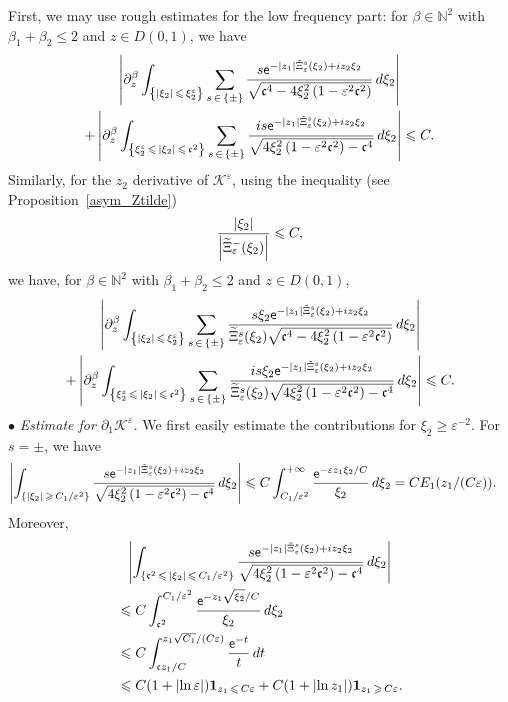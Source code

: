 \documentclass[10pt]{amsart}
\theoremstyle{definition}\newtheorem{defi}[theo]{Definition}\newtheorem{rema}[theo]{Remark}\newtheorem{exam}[theo]{Example}\newtheorem{exem}[theo]{Example}\newtheorem{nota}[theo]{Notation}
\newcommand*\p{\partial}
\newcommand*\N{\mathbb N}
\newcommand*\BK{\mathcal{K}}
\newcommand{\bfun}{\mathbf{1}}
\newcommand*\ex{{\sf e}}
\newcommand*\cs{{\mathfrak c}}
\newcommand*\ii{\infty}
\newcommand*\gs{\geqslant }
\newcommand*\ls{\leqslant }
\newcommand*\e{\varepsilon}
\renewcommand*\t{\tilde}
\let\oldtilde\tilde
\renewcommand*{\tilde}[1]{\mathchoice{\widetilde{#1}}{\widetilde{#1}}{\oldtilde{#1}}{\oldtilde{#1}}}
\begin{document}
First, we may use rough estimates for the low frequency part: for $\beta \in \N^2 $ with $ \beta_1 + \beta_2 \ls 2 $ and $ z \in D(0,1) $, we have
\begin{multline*}
 \left\lvert \p^\beta_z \int_{\left\{ |\xi_2 |\,\ls\,\xi_2^\e\right\} } \sum_{s\,\in\,\{ \pm \} }
\frac{ s \ex^{- |z_1| \t\Xi_\e^s (\xi_2) + i z_2 \xi_2} }{ \sqrt{ \cs^4 - 4 \xi_2^2 \left(1 - \e^2 \cs^2\right) } } \, d\xi_2
\right\rvert\\
+\left\lvert \p^\beta_z \int_{\left\{ \xi_2^\e \,\ls\,|\xi_2 |\,\ls\,\cs^2\right\} } \sum_{s\, \in\,\{ \pm \} } \frac{ i s \ex^{- |z_1| \t\Xi_\e^s (\xi_2) + i z_2 \xi_2} }{
\sqrt{ 4 \xi_2^2 \left(1 - \e^2 \cs^2\right) - \cs^4 } } \, d\xi_2 \right\rvert
\ls C.
\end{multline*}
Similarly, for the $ z_2 $ derivative of $ \BK^\e $, using the inequality (see Proposition~\ref{asym_Ztilde})
\[
\frac{\lvert \xi_2 \rvert}{ \left\lvert \t\Xi_\e^- (\xi_2) \right\rvert } \ls C,
\]
we have, for $ \beta \in \N^2 $ with $ \beta_1 + \beta_2 \ls 2 $ and $ z \in D(0,1) $,
\begin{multline*}
 \left\lvert \p^\beta_z \int_{\left\{ |\xi_2 | \,\ls\,\xi_2^\e \right\} } \sum_{s\,\in\,\{ \pm \} }
\frac{ s \xi_2 \ex^{- |z_1| \t\Xi_\e^s (\xi_2) + i z_2 \xi_2} }{ \t\Xi_\e^s (\xi_2) \sqrt{ \cs^4 - 4 \xi_2^2 \left(1 - \e^2 \cs^2\right) } } \, d\xi_2
\right\rvert\\
+
\left\lvert \p^\beta_z \int_{\left\{ \xi_2^\e \,\ls\,|\xi_2 |\,\ls\,\cs^2 \right\} } \sum_{s\,\in\,\{ \pm \} } \frac{ i s \xi_2 \ex^{- |z_1| \t\Xi_\e^s (\xi_2) + i z_2 \xi_2} }{
\t\Xi_\e^s (\xi_2) \sqrt{ 4 \xi_2^2 \left(1 - \e^2 \cs^2\right) - \cs^4 } } \, d\xi_2 \right\rvert
\ls C.
\end{multline*}
$ \bullet $ \emph{Estimate for $ \p_1 \BK^\e $.} We first easily estimate the contributions for $ \xi_2 \gs \e^{-2} $. For $ s = \pm $, we have
\begin{align*}
\left\lvert \int_{\left\{ |\xi_2 |\, \gs\,C_1 / \e^{2} \right\} } \frac{ s \ex^{- |z_1| \t\Xi_\e^s (\xi_2) + i z_2 \xi_2} }{
\sqrt{ 4 \xi_2^2 \left(1 - \e^2 \cs^2\right) - \cs^4 } } \, d\xi_2 \right\rvert & \ls C \int_{C_1/\e^{2}}^{+\ii } \frac{ \ex^{- \e z_1 \xi_2 / C } }{ \xi_2} \, d\xi_2 = C E_1 (z_1/ (C \e)).
\end{align*}
Moreover,
\begin{multline*}
\left\lvert \int_{\left\{ \cs^2\,\ls\,|\xi_2 | \,\ls\,C_1 / \e^{2} \right\} } \frac{ s \ex^{- |z_1| \t\Xi_\e^s (\xi_2) + i z_2 \xi_2} }{
\sqrt{ 4 \xi_2^2 \left(1 - \e^2 \cs^2\right) - \cs^4 } } \, d\xi_2 \right\rvert\\
\begin{aligned}
& \ls C \int_{\cs^2}^{C_1 / \e^{2}} \frac{ \ex^{- z_1 \sqrt{ \xi_2}/C } }{ \xi_2} \, d\xi_2
\\ & \ls C \int_{\cs z_1/C }^{z_1 \sqrt{C_1} / (C \e) } \frac{ \ex^{- t} }{ t } \, dt
\\ & \ls C (1+ \lvert \ln \e \rvert) \bfun_{z_1\,\ls\,C \e} + C (1+ \lvert \ln z_1 \rvert) \bfun_{z_1\,\gs\,C \e}.
\end{aligned}
\end{multline*}
\end{document}
